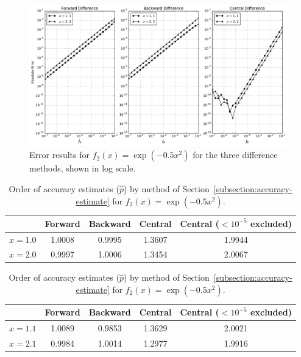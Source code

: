 \documentclass[11pt]{article}
\begin{document}
\begin{figure}[!h]
    \centering
    \includegraphics[width=\textwidth]{../figures/f2.pdf}
    \caption{Error results for $f_2(x) = \exp(-0.5x^2)$ for the three difference methods, shown in log scale.}
    \label{fig:func2-results}
\end{figure}

\begin{table}[!h]
    \centering
    \begin{tabular}{|c|c|c|c|c|}
        \hline
                & Forward & Backward & Central & Central ($< 10^{-5}$ excluded) \\
        \hline
        $x=1.0$ & 1.0008  & 0.9995   & 1.3607  & 1.9944 \\
        \hline
        $x=2.0$ & 0.9997  & 1.0006   & 1.3454  & 2.0067 \\
        \hline
    \end{tabular}
    \caption{Order of accuracy estimates ($\hat{p}$) by method of Section~\ref{subsection:accuracy-estimate} for $f_1(x) = \sin(x)$.}
    \label{tab:order-estimates-f1}

    \vspace{0.5in}

    \begin{tabular}{|c|c|c|c|c|}
        \hline
                & Forward & Backward & Central & Central ($< 10^{-5}$ excluded) \\
        \hline
        $x=1.1$ & 1.0089 & 0.9853   & 1.3629  & 2.0021  \\
        \hline
        $x=2.1$ & 0.9984 & 1.0014   & 1.2977  & 1.9916  \\
        \hline
    \end{tabular}
    \caption{Order of accuracy estimates ($\hat{p}$) by method of Section~\ref{subsection:accuracy-estimate} for $f_2(x) = \exp(-0.5x^2)$.}
    \label{tab:order-estimates-f2}
\end{table}
\end{document}
